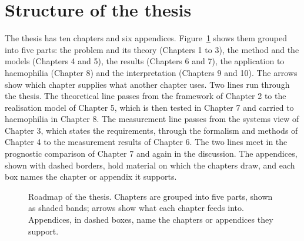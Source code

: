 \section{Structure of the thesis}

The thesis has ten chapters and six appendices. Figure~\ref{fig:intro-roadmap} shows them grouped into five parts: the problem and its theory (Chapters 1 to 3), the method and the models (Chapters 4 and 5), the results (Chapters 6 and 7), the application to haemophilia (Chapter 8) and the interpretation (Chapters 9 and 10). The arrows show which chapter supplies what another chapter uses. Two lines run through the thesis. The theoretical line passes from the framework of Chapter 2 to the realisation model of Chapter 5, which is then tested in Chapter 7 and carried to haemophilia in Chapter 8. The measurement line passes from the systems view of Chapter 3, which states the requirements, through the formalism and methods of Chapter 4 to the measurement results of Chapter 6. The two lines meet in the prognostic comparison of Chapter 7 and again in the discussion. The appendices, shown with dashed borders, hold material on which the chapters draw, and each box names the chapter or appendix it supports.

\begin{figure}[htbp]
\centering

\caption{Roadmap of the thesis. Chapters are grouped into five parts, shown as shaded bands; arrows show what each chapter feeds into. Appendices, in dashed boxes, name the chapters or appendices they support.}
\label{fig:intro-roadmap}
\end{figure}


